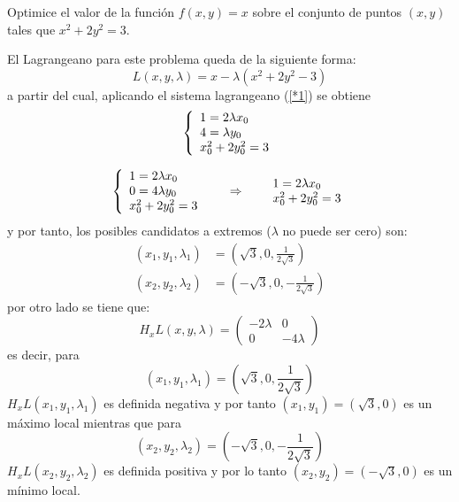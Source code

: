 \begin{ejemplo}
Optimice el valor de la funci\'on $f(x,y)=x$ sobre el conjunto de puntos
$(x,y)$ tales que $x^{2}+2y^{2}=3$.

\begin{solucion}
El Lagrangeano para este problema queda de la siguiente forma:%
\[
L(x,y,\lambda)=x-\lambda(x^{2}+2y^{2}-3)
\]
a partir del cual, aplicando el sistema lagrangeano (\ref{*1}) se obtiene
\[%
\begin{array}
[c]{lllll}%
\left\{
\begin{array}
[c]{l}%
1=2\lambda x_0 \\
4=\lambda y_0 \\
x_0^{2}+2y_0^{2} = 3
\end{array}
\right.
\end{array}
\]

\[%
\begin{array}
[c]{lllll}%
\left\{
\begin{array}
[c]{l}%
1=2\lambda x_0 \\
0=4\lambda y_0 \\
x_0^{2}+2y_0^{2} = 3
\end{array}
\right.   & \quad\Rightarrow\quad &
\begin{array}
[c]{l}%
1=2\lambda x_0 \\
x_0^{2}+2y_0^{2} = 3
\end{array}
\end{array}
\]
y por tanto, los posibles candidatos a extremos ($\lambda$ no puede ser cero)
son:%
\begin{align*}
(x_{1},y_{1},\lambda_{1})  & =\left(  \sqrt{3},0,\frac{1}{2\sqrt{3}}\right)
\\
(x_{2},y_{2},\lambda_{2})  & =\left(  -\sqrt{3},0,-\frac{1}{2\sqrt{3}%
}\right)
\end{align*}
por otro lado se tiene que:
\[H_{x}L(x,y,\lambda)=
\begin{pmatrix}
-2 \lambda & 0 \\
0 & -4 \lambda
\end{pmatrix}\]
es decir, para $$(x_{1},y_{1},\lambda_{1})=\left(\sqrt{3},0,\frac{1}{2\sqrt{3}}\right)$$ $H_{x}L(x_{1},y_{1},\lambda_{1})$ es definida negativa y
por tanto $(x_{1},y_{1})=(\sqrt{3},0)$ es un m\'aximo local mientras que para $$(x_{2},y_{2},\lambda_{2})=\left(-\sqrt{3},0,-\frac{1}{2\sqrt{3}}\right)$$ $H_{x}L(x_{2},y_{2},\lambda_{2})$ es definida positiva  y por lo
tanto $(x_{2},y_{2})=(-\sqrt{3},0)$ es un m\'inimo local.
\end{solucion}
\end{ejemplo}

